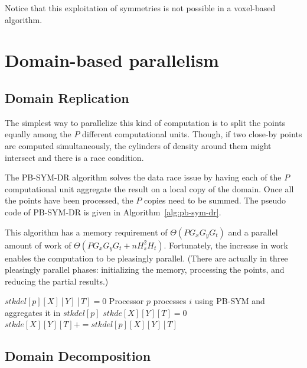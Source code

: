 \documentclass[10pt, conference, compsocconf]{IEEEtran}
\begin{document}
Notice that this exploitation of symmetries is not possible in a
voxel-based algorithm.

\label{sec:algo-pb-sym}


\section{Domain-based parallelism}
\label{sec:pb-sym-domain}

\subsection{Domain Replication}

The simplest way to parallelize this kind of computation is to split
the points equally among the $P$ different computational
units. Though, if two close-by points are computed
simultaneously, the cylinders of density around them might intersect and
there is a race condition.

The PB-SYM-DR algorithm solves the data race issue by having each of
the $P$ computational unit aggregate the result on a local copy of the
domain. Once all the points have been processed, the $P$ copies need
to be summed. The pseudo code of PB-SYM-DR is given in
Algorithm~\ref{alg:pb-sym-dr}.

This algorithm has a memory requirement of $\Theta (P  G_x  G_y  G_t)$
and a parallel amount of work of $\Theta (P  G_x  G_y  G_t + n  H_s^2
 H_t)$. Fortunately, the increase in work enables the computation to be
pleasingly parallel. (There are actually in three pleasingly parallel phases:
initializing the memory, processing the points, and reducing the partial results.)

\begin{algorithm}
\caption{\textsc{PB-SYM-DR}}
\scriptsize
\begin{algorithmic}
    \State $stkdel[p][X][Y][T] = 0$
  \EndFor
\EndFor
%
  \State Processor $p$ processes $i$ using PB-SYM and aggregates it in $stkdel[p]$
\EndFor
%
  \State $stkde[X][Y][T] = 0$
    \State $stkde[X][Y][T] += stkdel[p][X][Y][T]$
  \EndFor
\EndFor
\end{algorithmic}
\label{alg:pb-sym-dr}
\end{algorithm}

\subsection{Domain Decomposition}
\label{sec:pb-sym-dd}
\end{document}
